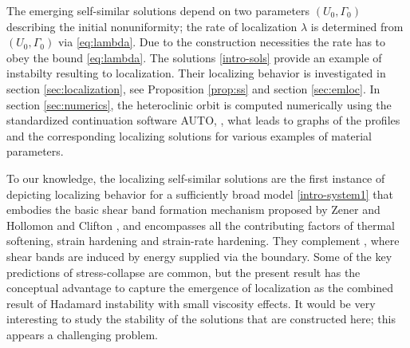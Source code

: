 \documentclass[usletter,11pt]{article}
\theoremstyle{remark}
\begin{document}

The emerging self-similar solutions depend on two parameters $(U_0, \Gamma_0)$ describing the initial nonuniformity; the rate of localization $\lambda$ is 
determined from $(U_0, \Gamma_0)$ via \eqref{eq:lambda}. Due to the construction necessities the rate has to obey the bound \eqref{eq:lambda}.
The solutions \eqref{intro-sols} provide an example of instabilty resulting to localization. Their localizing behavior is investigated in section \ref{sec:localization}, see
Proposition \ref{prop:ss} and section \ref{sec:emloc}.
In section \ref{sec:numerics}, the heteroclinic orbit is computed numerically using the standardized continuation software AUTO, \cite{Doedel_1981,DK_1986,DCFKSW_1999},
what leads to graphs of the profiles and the corresponding localizing solutions for various examples of material parameters.


To our knowledge, the localizing self-similar solutions are the first instance of depicting localizing behavior for a sufficiently broad model \eqref{intro-system1} 
that embodies the basic  shear band formation mechanism proposed by Zener and Hollomon \cite{ZH} and Clifton \cite{clifton_rev_1990}, and encompasses 
all the contributing factors  of thermal softening, strain hardening and strain-rate hardening.
They complement \cite{Tz_1987}, where shear bands are induced by energy supplied via the boundary. 
Some of the key predictions of stress-collapse are common, but the present result has the conceptual 
advantage to capture the emergence of localization as the combined result
of Hadamard instability with small viscosity effects.
It would be very interesting to study the stability of the solutions that are constructed here; this
appears a challenging problem.
\end{document}
